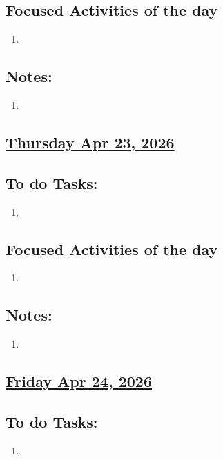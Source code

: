 \subsection*{Focused Activities of the day}
\begin{enumerate}[\ding{212}]  
    \item  
\end{enumerate}
\subsection*{Notes:}
\begin{enumerate}
    \item 
\end{enumerate}
\subsection*{\underline{Thursday Apr 23, 2026}}
\subsection*{To do Tasks:}
\begin{enumerate}
    \item 
\end{enumerate}
\subsection*{Focused Activities of the day}
\begin{enumerate}[\ding{212}]  
    \item 
\end{enumerate}
\subsection*{Notes:}
\begin{enumerate}
    \item  
\end{enumerate}
\subsection*{\underline{Friday Apr 24, 2026}}
\subsection*{To do Tasks:}
\begin{enumerate}
    \item 
\end{enumerate}
